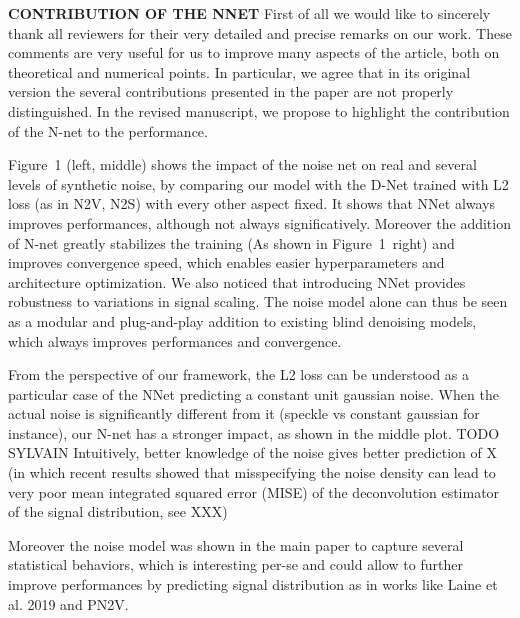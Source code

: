 \documentclass{article}
\begin{document}
\textbf{CONTRIBUTION OF THE NNET}
First of all we would like to sincerely thank all reviewers for their very detailed and precise remarks on our work. These comments are very useful for us to improve many aspects of the article, both on theoretical and numerical points. In particular, we agree that in its original version the several contributions presented in the paper are not properly distinguished. In the revised manuscript, we propose to highlight the contribution of the N-net to the performance.

Figure~1 (left, middle) shows the impact of the noise net on real and several levels of synthetic noise, by comparing our model with the D-Net trained with L2 loss (as in N2V, N2S) with every other aspect fixed. It shows that NNet always improves performances, although not always significatively. Moreover the addition of N-net greatly stabilizes the training (As shown in Figure~1~right) and improves convergence speed, which enables easier hyperparameters and architecture optimization. We also noticed that introducing NNet provides robustness to variations in signal scaling. The noise model alone can thus be seen as a modular and plug-and-play addition to existing blind denoising models, which always improves performances and convergence.

From the perspective of our framework, the L2 loss can be understood as a particular case of the NNet predicting a constant unit gaussian noise. When the actual noise is significantly different from it (speckle vs constant gaussian for instance), our N-net has a stronger impact, as shown in the middle plot.
TODO SYLVAIN  Intuitively, better knowledge of the noise gives better prediction of X (in which recent results showed that misspecifying the noise density can lead to very poor mean integrated squared error (MISE) of the deconvolution estimator of the signal distribution, see XXX)

Moreover the noise model was shown in the main paper to capture several statistical behaviors, which is interesting per-se and could allow to further improve performances by predicting signal distribution as in works like Laine et al. 2019 and PN2V.
\end{document}
